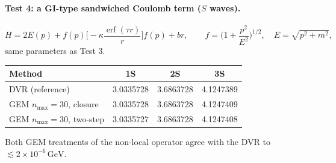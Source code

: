 \documentclass[11pt,a4paper]{article}
\numberwithin{equation}{section}
\theoremstyle{definition}
\theoremstyle{plain}
\theoremstyle{remark}
\numberwithin{algorithm}{section}
\newcommand{\erf}{\operatorname{erf}}
\newcommand{\GeV}{\,\mathrm{GeV}}
\begin{document}
\paragraph{Test 4: a GI-type sandwiched Coulomb term ($S$ waves).}
\[
H=2E(p)+f(p)\Big[-\kappa\frac{\erf(\tau r)}{r}\Big]f(p)+br,\qquad f=\Big(1+\frac{p^2}{E^2}\Big)^{1/2},\quad E=\sqrt{p^2+m^2},
\]
same parameters as Test 3.
\begin{center}\small
\begin{tabular}{@{}lccc@{}}\toprule
Method & 1S & 2S & 3S\\\midrule
DVR (reference) & 3.0335728 & 3.6863728 & 4.1247389\\
GEM $n_{\max}=30$, closure & 3.0335728 & 3.6863728 & 4.1247409\\
GEM $n_{\max}=30$, two-step & 3.0335727 & 3.6863728 & 4.1247408\\\bottomrule
\end{tabular}
\end{center}
Both GEM treatments of the non-local operator agree with the DVR to $\lesssim2\times10^{-6}\GeV$.
\end{document}
